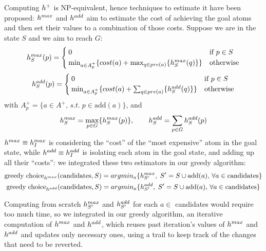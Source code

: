 Computing $h^+$ is NP-equivalent, hence techniques to estimate it have been proposed: $h^{max}$ and $h^{add}$ \cite{Bonet_01} aim to estimate the cost of achieving the goal atoms and then set their values to a combination of those costs.
Suppose we are in the state $S$ and we aim to reach $G$:
$$h^{max}_S(p)=\begin{cases}
    0&\mbox{if }p\in S\\
    \min_{a\in A^+_p}\{cost(a)+\max_{q\in pre(a)}\{h^{max}_S(q)\}\}&\mbox{otherwise}
\end{cases}$$
$$h^{add}_S(p)=\begin{cases}
    0&\mbox{if }p\in S\\
    \min_{a\in A^+_p}\{cost(a)+\sum_{q\in pre(a)}\{h^{add}_S(q)\}\}&\mbox{otherwise}
\end{cases}$$
with $A^+_p=\{a\in A^+,\,s.t.\;p\in\mbox{add}(a)\}$, and
$$h^{max}_S=\max_{p\in G}\{h^{max}_S(p)\},\qquad h^{add}_S=\sum_{p\in G}h^{add}_S(p)$$
$h^{max}\equiv h^{max}_I$ is considering the ``cost'' of the ``most expensive'' atom in the goal state, while $h^{add}\equiv h^{add}_I$ is isolating each atom in the goal state, and adding up all their ``costs'': we integrated these two estimators in our greedy algorithm:
\begin{gather*}
    \mbox{greedy choice}_{h^{max}}(\mbox{candidates}, S)=argmin_a\{h^{max}_{S'},\;S'=S\cup\mbox{add}(a),\,\forall a\in\mbox{candidates}\}\\
    \mbox{greedy choice}_{h^{add}}(\mbox{candidates}, S)=argmin_a\{h^{add}_{S'},\;S'=S\cup\mbox{add}(a),\,\forall a\in\mbox{candidates}\}
\end{gather*}

Computing from scratch $h^{max}_{S'}$ and $h^{add}_{S'}$ for each $a\in$ candidates would require too much time, so we integrated in our greedy algorithm, an iterative computation of $h^{max}$ and $h^{add}$, which reuses past iteration's values of $h^{max}$ and $h^{add}$ and updates only necessary ones, using a trail to keep track of the changes that need to be reverted.